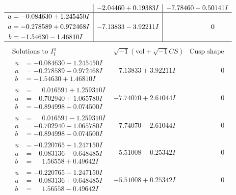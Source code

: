 \documentclass[1p]{elsarticle_modified}
\theoremstyle{definition}
\newcommand{\I}{\sqrt{-1}}
\begin{document}
$$\begin{array}{c|c|c}
 & -2.04460 + 0.19383 I & -7.78460 - 0.50141 I \\ \hline\begin{aligned}
u &= -0.084630 + 1.245450 I \\
a &= -0.278589 + 0.972468 I \\
b &= -1.54630 - 1.46810 I\end{aligned}
 & -7.13833 - 3.92211 I & \phantom{-0.000000 } 0\\
 \hline 
 \end{array}$$\newpage$$\begin{array}{c|c|c}  
\text{Solutions to }I^u_{1}& \I (\text{vol} + \sqrt{-1}CS) & \text{Cusp shape}\\
 \hline 
\begin{aligned}
u &= -0.084630 - 1.245450 I \\
a &= -0.278589 - 0.972468 I \\
b &= -1.54630 + 1.46810 I\end{aligned}
 & -7.13833 + 3.92211 I & \phantom{-0.000000 } 0 \\ \hline\begin{aligned}
u &= \phantom{-}0.016591 + 1.259310 I \\
a &= -0.702940 + 1.065780 I \\
b &= -0.894998 + 0.074500 I\end{aligned}
 & -7.74070 + 2.61044 I & \phantom{-0.000000 } 0 \\ \hline\begin{aligned}
u &= \phantom{-}0.016591 - 1.259310 I \\
a &= -0.702940 - 1.065780 I \\
b &= -0.894998 - 0.074500 I\end{aligned}
 & -7.74070 - 2.61044 I & \phantom{-0.000000 } 0 \\ \hline\begin{aligned}
u &= -0.220765 + 1.247150 I \\
a &= -0.083136 - 0.648485 I \\
b &= \phantom{-}1.56558 + 0.49642 I\end{aligned}
 & -5.51008 - 0.25342 I & \phantom{-0.000000 } 0 \\ \hline\begin{aligned}
u &= -0.220765 - 1.247150 I \\
a &= -0.083136 + 0.648485 I \\
b &= \phantom{-}1.56558 - 0.49642 I\end{aligned}
 & -5.51008 + 0.25342 I & \phantom{-0.000000 } 0 \\ \hline\begin{aligned}

\end{aligned}
\end{array}$$
\end{document}
